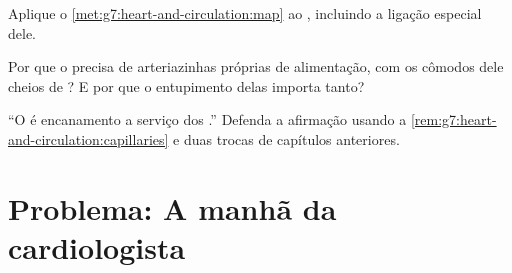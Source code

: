 \begin{exercise}[$\star\star$]\label{exo:g7:heart-and-circulation:10}
Aplique o \cref{met:g7:heart-and-circulation:map} ao , incluindo a ligação especial dele.
\end{exercise}

\begin{exercise}[$\star\star$]\label{exo:g7:heart-and-circulation:11}
Por que o  precisa de arteriazinhas próprias de alimentação,
com os cômodos dele cheios de ? E por que o entupimento delas
importa tanto?
\end{exercise}

\begin{exercise}[$\star\star\star$]\label{exo:g7:heart-and-circulation:12}
``O  é encanamento a serviço dos .'' Defenda a
afirmação usando a \cref{rem:g7:heart-and-circulation:capillaries} e
duas trocas de capítulos anteriores.
\end{exercise}

\section{Problema: A manhã da cardiologista}

